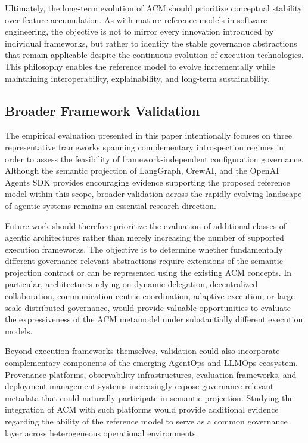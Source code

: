 \documentclass[10pt]{article}
\begin{document}
Ultimately, the long-term evolution of ACM should prioritize conceptual stability over feature accumulation. As with mature reference models in software engineering, the objective is not to mirror every innovation introduced by individual frameworks, but rather to identify the stable governance abstractions that remain applicable despite the continuous evolution of execution technologies. This philosophy enables the reference model to evolve incrementally while maintaining interoperability, explainability, and long-term sustainability.

\subsection{Broader Framework Validation}
\label{sec:future_framework_validation}

The empirical evaluation presented in this paper intentionally focuses on three representative frameworks spanning complementary introspection regimes in order to assess the feasibility of framework-independent configuration governance. Although the semantic projection of LangGraph, CrewAI, and the OpenAI Agents SDK provides encouraging evidence supporting the proposed reference model within this scope, broader validation across the rapidly evolving landscape of agentic systems remains an essential research direction.

Future work should therefore prioritize the evaluation of additional classes of agentic architectures rather than merely increasing the number of supported execution frameworks. The objective is to determine whether fundamentally different governance-relevant abstractions require extensions of the semantic projection contract or can be represented using the existing ACM concepts. In particular, architectures relying on dynamic delegation, decentralized collaboration, communication-centric coordination, adaptive execution, or large-scale distributed governance, would provide valuable opportunities to evaluate the expressiveness of the ACM metamodel under substantially different execution models.

Beyond execution frameworks themselves, validation could also incorporate complementary components of the emerging AgentOps and LLMOps ecosystem. Provenance platforms, observability infrastructures, evaluation frameworks, and deployment management systems increasingly expose governance-relevant metadata that could naturally participate in semantic projection. Studying the integration of ACM with such platforms would provide additional evidence regarding the ability of the reference model to serve as a common governance layer across heterogeneous operational environments.
\end{document}
